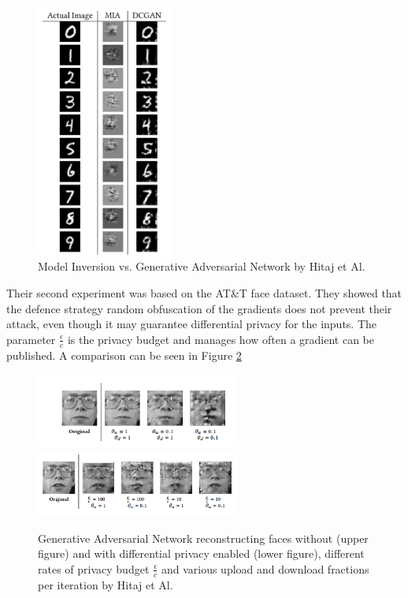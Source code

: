 \documentclass[
	ngerman,
	ruledheaders=section,%
	class=report,%
	thesis={type=bachelor},%
	accentcolor=1b,%
	custommargins=true,%
	marginpar=false,%
	parskip=half-,%
	fontsize=11pt,%
]{tudapub}
\begin{document}
\begin{figure}[H] 
  \centering
    \includegraphics[width=0.4\textwidth]{Figures/MI_vs_GAN.PNG}
  \caption{Model Inversion vs. Generative Adversarial Network  by Hitaj et Al. \cite{hitaj2017deep}}
  \label{fig:mi_vs_gan}
\end{figure}

Their second experiment was based on the AT\&T face dataset. They showed that the defence strategy random obfuscation of the gradients does not prevent their attack, even though it may guarantee differential privacy for the inputs. The parameter $\frac{\epsilon}{c}$ is the privacy budget and manages how often a gradient can be published. A comparison can be seen in Figure \ref{fig:gan_face}


\begin{figure}[H] 
  \centering
    \includegraphics[width=0.6\textwidth]{Figures/face_no_dp.PNG}\\
    \includegraphics[width=0.6\textwidth]{Figures/face_dp.PNG}
  \caption{ Generative Adversarial Network reconstructing faces without (upper figure) and with differential privacy enabled (lower figure), different rates of privacy budget $\frac{\epsilon}{c}$ and various upload and download fractions per iteration by Hitaj et Al. \cite{hitaj2017deep}}
  \label{fig:gan_face}
\end{figure}
\end{document}
